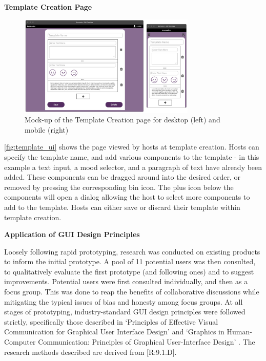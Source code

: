 \documentclass[9pt, titlepage]{extarticle}
\begin{document}
\textbf{Template Creation Page}
\begin{figure}[h]
\centering
\includegraphics[width=0.75\textwidth]{assets/Template_Edit.png}
\caption{Mock-up of the Template Creation page for desktop (left) and mobile (right)}
\label{fig:template_ui}
\end{figure}

\autoref{fig:template_ui} shows the page viewed by hosts at template creation. Hosts can specify the template name, and add various components to the template - in this example a text input, a mood selector, and a paragraph of text have already been added. These components can be dragged around into the desired order, or removed by pressing the corresponding bin icon. The plus icon below the components will open a dialog allowing the host to select more components to add to the template. Hosts can either save or discard their template within template creation.

\textbf{Application of GUI Design Principles}

Loosely following rapid prototyping, research was conducted on existing products to inform the initial prototype. A pool of 11 potential users was then consulted, to qualitatively evaluate the first prototype (and following ones) and to suggest improvements. Potential users were first consulted individually, and then as a focus group. This was done to reap the benefits of collaborative discussions while mitigating the typical issues of bias and honesty among focus groups. At all stages of prototyping, industry-standard GUI design principles were followed strictly, specifically those described in `Principles of Effective Visual Communication for Graphical User Interface Design' \autocite{book:GUI1} and `Graphics in Human-Computer Communication: Principles of Graphical User-Interface Design' \autocite{book:GUI2}. The research methods described are derived from [R:9.1.D].\newline
\end{document}
